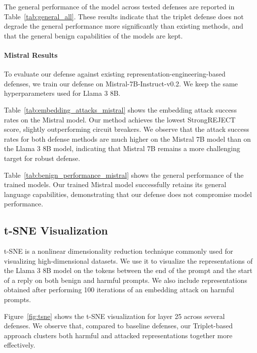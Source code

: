 \documentclass[11pt]{article}
\begin{document}
The general performance of the model across tested defenses are reported in Table~\ref{tab:general_all}.
These results indicate that the triplet defense does not degrade the general performance more significantly than existing methods, and that the general benign capabilities of the models are kept.

\label{app:appendix_additional_results}

\paragraph{Mistral Results}
\label{app:mistral}

To evaluate our defense against existing representation-engineering-based defenses, we train our defense on Mistral-7B-Instruct-v0.2. We keep the same hyperparameters used for Llama 3 8B.

Table~\ref{tab:embedding_attacks_mistral} shows the embedding attack success rates
on the Mistral model. Our method achieves the lowest StrongREJECT score, slightly outperforming circuit breakers. We observe that the attack success rates for both defense methods are much higher on the Mistral 7B model than on the Llama 3 8B model, indicating that Mistral 7B remains a more challenging target for robust defense.

Table~\ref{tab:benign_performance_mistral} shows the general performance of the trained models.
Our trained Mistral model successfully retains its general language capabilities, demonstrating
that our defense does not compromise model performance.

\subsection{t-SNE Visualization}

t-SNE \cite{JMLR:v9:vandermaaten08a} is a nonlinear dimensionality reduction technique commonly used for visualizing high-dimensional datasets.
We use it to visualize the representations of the Llama 3 8B model
on the tokens between the end of the prompt and the start of a reply on both benign and harmful prompts. We also include representations obtained after performing 100 iterations of an embedding attack on harmful prompts.

Figure~\ref{fig:tsne} shows the t-SNE visualization for layer 25 across several defenses.
We observe that, compared to baseline defenses, our Triplet-based approach clusters both harmful and attacked representations together more effectively.
\end{document}
